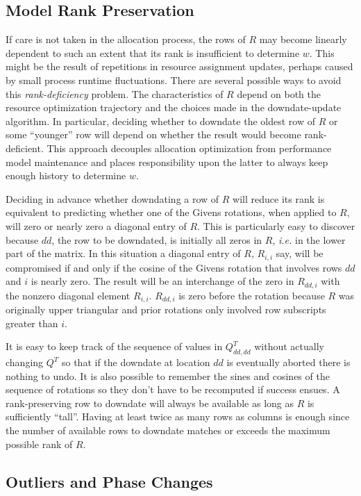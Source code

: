 \subsection*{Model Rank Preservation}

If care is not taken in the allocation process,
the rows of $R$ may become linearly dependent
to such an extent that its rank is insufficient to determine $w$.
This might be the result of repetitions in resource assignment updates,
perhaps caused by small process runtime fluctuations.
There are several possible ways to avoid this \emph{rank-deficiency} problem.
The characteristics of $R$ depend on both the resource optimization trajectory and the
choices made in the downdate-update algorithm.
In particular, deciding whether to downdate the oldest row of $R$ or some ``younger'' row
will depend on whether the result would become rank-deficient.
This approach decouples allocation optimization from performance model maintenance
and places responsibility upon the latter to always keep enough history to determine $w$.

Deciding in advance whether downdating a row of $R$ will reduce its rank
is equivalent to predicting whether one of the Givens rotations, when applied to $R$,
will zero or nearly zero a diagonal entry of $R$.
This is particularly easy to discover because $dd$, the row to be downdated, is initially all zeros in $R$,
\emph{i.e.} in the lower part of the matrix.
In this situation a diagonal entry of $R$, $R_{i,i}$ say, will be compromised if and only if the
cosine of the Givens rotation that involves rows $dd$ and $i$ is nearly zero.
The result will be an interchange of the zero in $R_{dd,i}$ with the nonzero diagonal element $R_{i,i}$.
$R_{dd,i}$ is zero before the rotation because
$R$ was originally upper triangular and prior rotations only involved row subscripts greater than $i$.

It is easy to keep track of the sequence of values in $Q^T_{dd,dd}$ without actually changing $Q^T$
so that if the downdate at location $dd$ is eventually aborted there is nothing to undo.
It is also possible to remember the sines and cosines of the sequence of rotations
so they don't have to be recomputed if success ensues.
A rank-preserving row to downdate will always be available as long as $R$ is sufficiently ``tall''.
Having at least twice as many rows as columns is enough since the number of available rows to downdate
matches or exceeds the maximum possible rank of $R$.

\subsection*{Outliers and Phase Changes}

